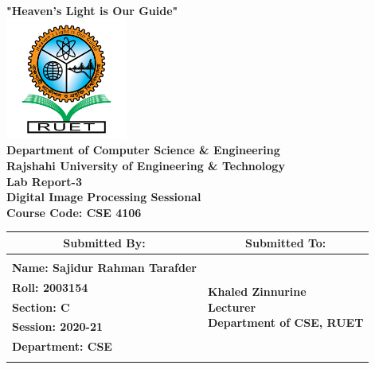 \documentclass[12pt,a4paper]{report}
\begin{document}
\begin{titlepage}
    \thispagestyle{empty}
    \centering
    \vspace*{0.5cm}
    {\large \textbf{"Heaven's Light is Our Guide"}}\\[0.3cm]
    \includegraphics[width=4cm]{../Lab5/ruet_logo.png}\\[0.4cm]
    {\Large \textbf{Department of Computer Science \& Engineering}}\\[0.3cm]
    {\large \textbf{Rajshahi University of Engineering \& Technology}}\\[0.8cm]
    {\LARGE \textbf{Lab Report-3}}\\[0.5cm]
    {\LARGE \textbf{Digital Image Processing Sessional}}\\[0.5cm]
    {\LARGE \textbf{Course Code: CSE 4106}}\\[0.3cm]

    \vspace{0.8cm}
    \begin{table}[h!]
    \centering
    \setlength{\arrayrulewidth}{1.5pt}
    \renewcommand{\arraystretch}{1.5}
    \begin{tabular}{|p{8.5cm}|p{6.5cm}|}
        \hline
        \multicolumn{1}{|c|}{\large \textbf{Submitted By:}} & \multicolumn{1}{c|}{\large \textbf{Submitted To:}} \\
        \hline
        & \\
        \large \textbf{Name: Sajidur Rahman Tarafder} & \multirow{5}{*}{\parbox{6.5cm}{\centering 
        \large \textbf{Khaled Zinnurine}\\
        \vspace{0.2cm}
        \large \textbf{Lecturer}\\
        \vspace{0.2cm}
        \large \textbf{Department of CSE, RUET}}}\\
        \large \textbf{Roll: 2003154} & \\
        \large \textbf{Section: C} & \\
        \large \textbf{Session: 2020-21} & \\
        \large \textbf{Department: CSE} & \\
        & \\
        \hline
    \end{tabular}
    \end{table}
\end{titlepage}
\end{document}
